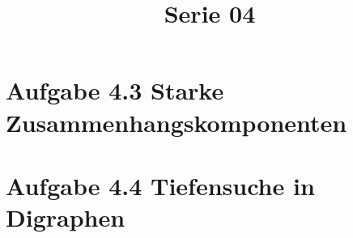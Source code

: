  
\title{Serie 04}

 

\section*{Aufgabe 4.3 Starke Zusammenhangskomponenten}

\section*{Aufgabe 4.4 Tiefensuche in Digraphen}


